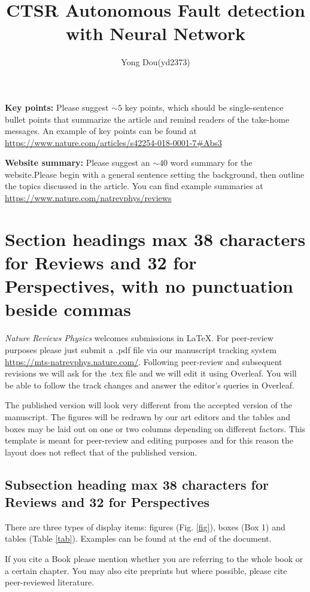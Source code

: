\documentclass[fleqn,10pt]{wlscirep}
\title{CTSR Autonomous Fault detection with Neural Network}
\author[1,*]{Yong Dou(yd2373)}
\affil[1]{Columbia University, Department of Chemical Engineering ,New York, NY}
\affil[*]{e-mail:yd2373@columbia.edu}
\begin{document}
\flushbottom
\maketitle

\thispagestyle{empty}

\noindent \textbf{Key points:} Please suggest $\sim 5$ key points, which should be single-sentence bullet points that summarize the article and remind readers of the take-home messages. An example of key points can be found at \url{https://www.nature.com/articles/s42254-018-0001-7#Abs3}

\noindent \textbf{Website summary:} Please suggest an $\sim 40$ word summary for the website.Please begin with a general sentence setting the background, then outline the topics discussed in the article. You can find example summaries at \url{https://www.nature.com/natrevphys/reviews}

\section*{Section headings max 38 characters for Reviews and 32 for Perspectives, with no punctuation beside commas}
\textit{Nature Reviews Physics} welcomes submissions in \LaTeX. For  peer-review purposes please just submit a .pdf file via our manuscript tracking system \url{https://mts-natrevphys.nature.com/}. Following peer-review and subsequent revisions we will ask for the .tex file and we will edit it using Overleaf. You will be able to follow the track changes and answer the editor's queries in Overleaf.

The published version will look very different from the accepted version of the manuscript. The figures will be redrawn by our art editors and the tables and boxes may be laid out  on one or two columns depending on different factors. This template is meant for peer-review and editing purposes and for this reason the layout does not reflect that of the published version. 

\subsection*{Subsection heading max 38 characters for Reviews and 32 for Perspectives}
There are three types of display items: figures (Fig. \ref{fig}), boxes (Box 1) and tables (Table \ref{tab}). Examples can be found at the end of the document.

If you cite a Book \cite{Book} please mention whether you are referring to the whole book or a certain chapter. You may also cite preprints\cite{arxiv} but where possible, please cite peer-reviewed literature.
\end{document}
